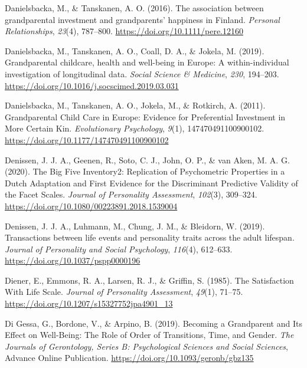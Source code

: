 \documentclass[
  english,
  man,floatsintext]{apa7}
\begin{document}
\leavevmode\hypertarget{ref-danielsbackaAssociationGrandparentalInvestment2016}{}%
Danielsbacka, M., \& Tanskanen, A. O. (2016). The association between grandparental investment and grandparents' happiness in Finland. \emph{Personal Relationships}, \emph{23}(4), 787--800. \url{https://doi.org/10.1111/pere.12160}

\leavevmode\hypertarget{ref-danielsbackaGrandparentalChildcareHealth2019}{}%
Danielsbacka, M., Tanskanen, A. O., Coall, D. A., \& Jokela, M. (2019). Grandparental childcare, health and well-being in Europe: A within-individual investigation of longitudinal data. \emph{Social Science \& Medicine}, \emph{230}, 194--203. \url{https://doi.org/10.1016/j.socscimed.2019.03.031}

\leavevmode\hypertarget{ref-danielsbackaGrandparentalChildCare2011}{}%
Danielsbacka, M., Tanskanen, A. O., Jokela, M., \& Rotkirch, A. (2011). Grandparental Child Care in Europe: Evidence for Preferential Investment in More Certain Kin. \emph{Evolutionary Psychology}, \emph{9}(1), 147470491100900102. \url{https://doi.org/10.1177/147470491100900102}

\leavevmode\hypertarget{ref-denissenBigFiveInventory2020}{}%
Denissen, J. J. A., Geenen, R., Soto, C. J., John, O. P., \& van Aken, M. A. G. (2020). The Big Five Inventory2: Replication of Psychometric Properties in a Dutch Adaptation and First Evidence for the Discriminant Predictive Validity of the Facet Scales. \emph{Journal of Personality Assessment}, \emph{102}(3), 309--324. \url{https://doi.org/10.1080/00223891.2018.1539004}

\leavevmode\hypertarget{ref-denissenTransactionsLifeEvents2019}{}%
Denissen, J. J. A., Luhmann, M., Chung, J. M., \& Bleidorn, W. (2019). Transactions between life events and personality traits across the adult lifespan. \emph{Journal of Personality and Social Psychology}, \emph{116}(4), 612--633. \url{https://doi.org/10.1037/pspp0000196}

\leavevmode\hypertarget{ref-dienerSatisfactionLifeScale1985}{}%
Diener, E., Emmons, R. A., Larsen, R. J., \& Griffin, S. (1985). The Satisfaction With Life Scale. \emph{Journal of Personality Assessment}, \emph{49}(1), 71--75. \url{https://doi.org/10.1207/s15327752jpa4901_13}

\leavevmode\hypertarget{ref-digessaBecomingGrandparentIts2019}{}%
Di Gessa, G., Bordone, V., \& Arpino, B. (2019). Becoming a Grandparent and Its Effect on Well-Being: The Role of Order of Transitions, Time, and Gender. \emph{The Journals of Gerontology, Series B: Psychological Sciences and Social Sciences}, Advance Online Publication. \url{https://doi.org/10.1093/geronb/gbz135}
\end{document}
